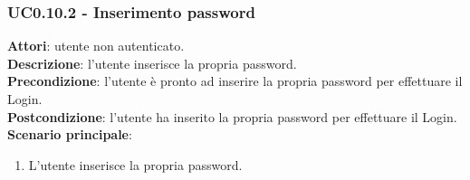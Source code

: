 	\subsubsection{UC0.10.2 - Inserimento password}{
		\label{uc0.10.2}
		\textbf{Attori}: utente non autenticato. \\
		\textbf{Descrizione}: l'utente  inserisce la propria password.	\\
		\textbf{Precondizione}: l'utente  è pronto ad inserire la propria password per effettuare il Login.	\\
		\textbf{Postcondizione}: l'utente  ha inserito la propria password per effettuare il Login.	\\
		\textbf{Scenario principale}:
		\begin{enumerate}
			\item L'utente inserisce la propria password.
		\end{enumerate}
		}
